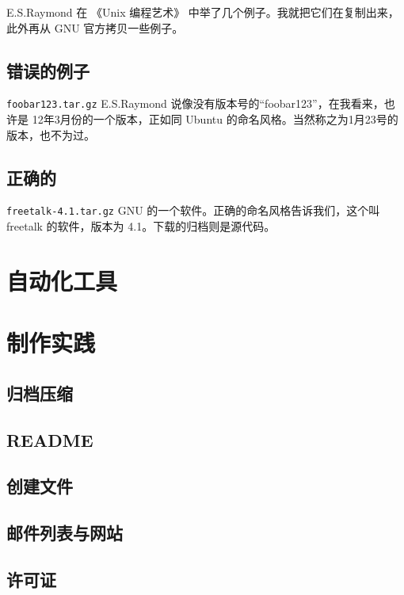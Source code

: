 \documentclass{ctexart}
\begin{document}
E.S.Raymond 在 《Unix 编程艺术》 中举了几个例子。我就把它们在复制出来，此外再从 GNU 官方拷贝一些例子。

\subsection{错误的例子}

\verb|foobar123.tar.gz| E.S.Raymond 说像没有版本号的“foobar123”，在我看来，也许是 12年3月份的一个版本，正如同 Ubuntu 的命名风格。当然称之为1月23号的版本，也不为过。

\subsection{正确的}

\verb|freetalk-4.1.tar.gz| GNU 的一个软件。正确的命名风格告诉我们，这个叫 freetalk 的软件，版本为 4.1。下载的归档则是源代码。


\section{自动化工具}


\section{制作实践}

\subsection{归档压缩}

\subsection{README}

\subsection{创建文件}

\subsection{邮件列表与网站}

\subsection{许可证}
\end{document}
